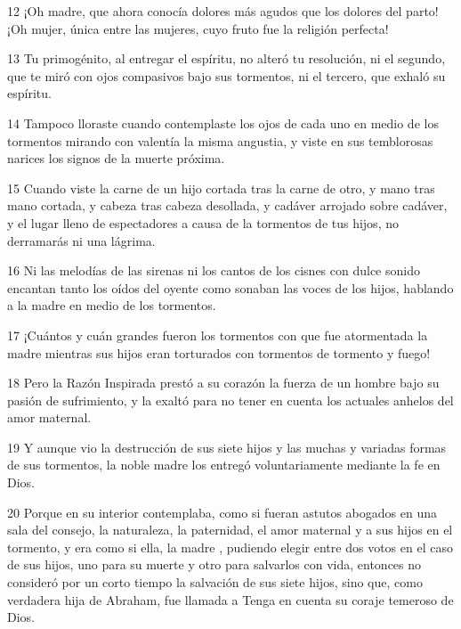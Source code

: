 \par 12 ¡Oh madre, que ahora conocía dolores más agudos que los dolores del parto! ¡Oh mujer, única entre las mujeres, cuyo fruto fue la religión perfecta!

\par 13 Tu primogénito, al entregar el espíritu, no alteró tu resolución, ni el segundo, que te miró con ojos compasivos bajo sus tormentos, ni el tercero, que exhaló su espíritu.

\par 14 Tampoco lloraste cuando contemplaste los ojos de cada uno en medio de los tormentos mirando con valentía la misma angustia, y viste en sus temblorosas narices los signos de la muerte próxima.

\par 15 Cuando viste la carne de un hijo cortada tras la carne de otro, y mano tras mano cortada, y cabeza tras cabeza desollada, y cadáver arrojado sobre cadáver, y el lugar lleno de espectadores a causa de la tormentos de tus hijos, no derramarás ni una lágrima.

\par 16 Ni las melodías de las sirenas ni los cantos de los cisnes con dulce sonido encantan tanto los oídos del oyente como sonaban las voces de los hijos, hablando a la madre en medio de los tormentos.

\par 17 ¡Cuántos y cuán grandes fueron los tormentos con que fue atormentada la madre mientras sus hijos eran torturados con tormentos de tormento y fuego!

\par 18 Pero la Razón Inspirada prestó a su corazón la fuerza de un hombre bajo su pasión de sufrimiento, y la exaltó para no tener en cuenta los actuales anhelos del amor maternal.

\par 19 Y aunque vio la destrucción de sus siete hijos y las muchas y variadas formas de sus tormentos, la noble madre los entregó voluntariamente mediante la fe en Dios.

\par 20 Porque en su interior contemplaba, como si fueran astutos abogados en una sala del consejo, la naturaleza, la paternidad, el amor maternal y a sus hijos en el tormento, y era como si ella, la madre , pudiendo elegir entre dos votos en el caso de sus hijos, uno para su muerte y otro para salvarlos con vida, entonces no consideró por un corto tiempo la salvación de sus siete hijos, sino que, como verdadera hija de Abraham, fue llamada a Tenga en cuenta su coraje temeroso de Dios.

